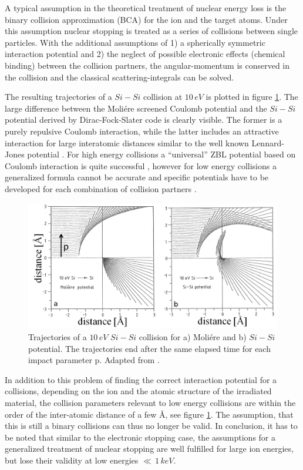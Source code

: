 A typical assumption in the theoretical treatment of nuclear energy loss is the binary collision approximation (BCA) for the ion and the target atoms. Under this assumption nuclear stopping is treated as a series of collisions between single particles. With the additional assumptions of 1) a spherically symmetric interaction potential and 2) the neglect of possible electronic effects (chemical binding) between the collision partners, the angular-momentum is conserved in the collision and the classical scattering-integrals can be solved. 

The resulting trajectories of a $Si-Si$ collision at $10\,eV$ is plotted in figure \ref{SiSi}. The large difference between the Moliére screened Coulomb potential and the $Si-Si$ potential derived by Dirac-Fock-Slater code is clearly visible. The former is a purely repulsive Coulomb interaction, while the latter includes an attractive interaction for large interatomic distances similar to the well known Lennard-Jones potential \cite{eckstein_computer_1991}. For high energy collisions a ``universal'' ZBL potential based on Coulomb interaction is quite successful \cite{ziegler_stopping_1985}, however for low energy collisions a generalized formula cannot be accurate and specific potentials have to be developed for each combination of collision partners \cite{dedkov_interatomic_1995,nordlund_repulsive_1997,albe_modeling_2002,nordlund_interatomic_2008}.

\begin{figure}
	\centering
		\includegraphics[width=.6\textwidth]{images/SiSicollision.png}
	\caption{Trajectories of a $10\,eV$ $Si-Si$ collision for a) Moliére and b) $Si-Si$ potential. The trajectories end after the same elapsed time for each impact parameter p. Adapted from \cite{eckstein_computer_1991}.}
	\label{SiSi}
\end{figure} 

In addition to this problem of finding the correct interaction potential for a collisions, depending on the ion and the atomic structure of the irradiated material, the collision parameters relevant to low energy collisions are within the order of the inter-atomic distance of a few \AA, see figure \ref{SiSi}. The assumption, that this is still a binary collisions can thus no longer be valid. In conclusion, it has to be noted that similar to the electronic stopping case, the assumptions for a generalized treatment of nuclear stopping are well fulfilled for large ion energies, but lose their validity at low energies $\ll\,1\,keV$.

